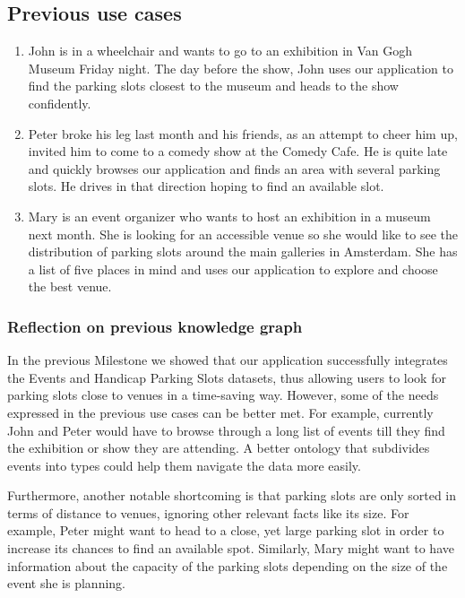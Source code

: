 \documentclass[runningheads,a4paper]{../../StyleFiles/llncs}
\begin{document}
\subsection{Previous use cases}
\begin{enumerate}
	\item John is in a wheelchair and wants to go to an exhibition in Van Gogh Museum Friday night. The day before the show, John uses our application to find the parking slots closest to the museum and heads to the show confidently. 
	\item Peter broke his leg last month and his friends, as an attempt to cheer him up, invited him to come to a comedy show at the Comedy Cafe. He is quite late and quickly browses our application and finds an area with several parking slots. He drives in that direction hoping to find an available slot. 
	\item Mary is an event organizer who wants to host an exhibition in a museum next month. She is looking for an accessible venue so she would like to see the distribution of parking slots around the main galleries in Amsterdam. She has a list of five places in mind and uses our application to explore and choose the best venue.
\end{enumerate}

\subsubsection{Reflection on previous knowledge graph} 
In the previous Milestone we showed that our application successfully integrates the Events and Handicap Parking Slots datasets, thus allowing users to look for parking slots close to venues in a time-saving way. However, some of the needs expressed in the previous use cases can be better met. For example, currently John and Peter would have to browse through a long list of events till they find the exhibition or show they are attending. A better ontology that subdivides events into types could help them navigate the data more easily. 

Furthermore, another notable shortcoming is that parking slots are only sorted in terms of distance to venues, ignoring other relevant facts like its size. For example, Peter might want to head to a close, yet large parking slot in order to increase its chances to find an available spot. Similarly, Mary might want to have information about the capacity of the parking slots depending on the size of the event she is planning.
\end{document}

